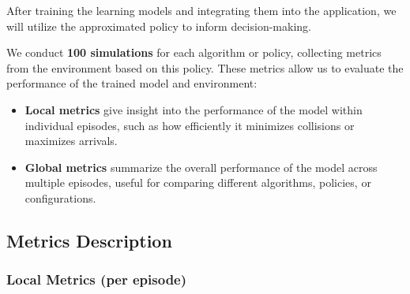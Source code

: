 After training the learning models and integrating them into the application, we will utilize the approximated policy to inform decision-making. 

We conduct \textbf{100 simulations} for each algorithm or policy, collecting metrics from the environment based on this policy. 
These metrics allow us to evaluate the performance of the trained model and environment:
\begin{itemize}
    \item \textbf{Local metrics} give insight into the performance of the model within individual episodes, such as how efficiently it minimizes collisions or maximizes arrivals.
    \item \textbf{Global metrics} summarize the overall performance of the model across multiple episodes, useful for comparing different algorithms, policies, or configurations.
\end{itemize}

\subsection{Metrics Description}

\subsubsection*{Local Metrics (per episode)}

